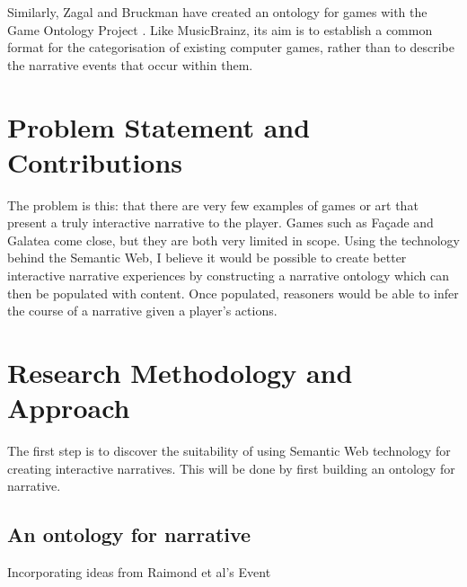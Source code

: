 \documentclass{llncs}
\begin{document}
Similarly, Zagal and Bruckman have created an ontology for games with the Game Ontology Project \cite{Zagal2007}. Like MusicBrainz, its aim is to establish a common format for the categorisation of existing computer games, rather than to describe the narrative events that occur within them.

\section{Problem Statement and Contributions}

The problem is this: that there are very few examples of games or art that present a truly interactive narrative to the player. Games such as Fa\c{c}ade \cite{Mateas} and Galatea \cite{shortgalatea} come close, but they are both very limited in scope. Using the technology behind the Semantic Web, I believe it would be possible to create better interactive narrative experiences by constructing a narrative ontology which can then be populated with content. Once populated, reasoners would be able to infer the course of a narrative given a player's actions.


\section{Research Methodology and Approach}

The first step is to discover the suitability of using Semantic Web technology for creating interactive narratives. This will be done by first building an ontology for narrative.

\subsection{An ontology for narrative}
Incorporating ideas from Raimond et al's Event
\end{document}
